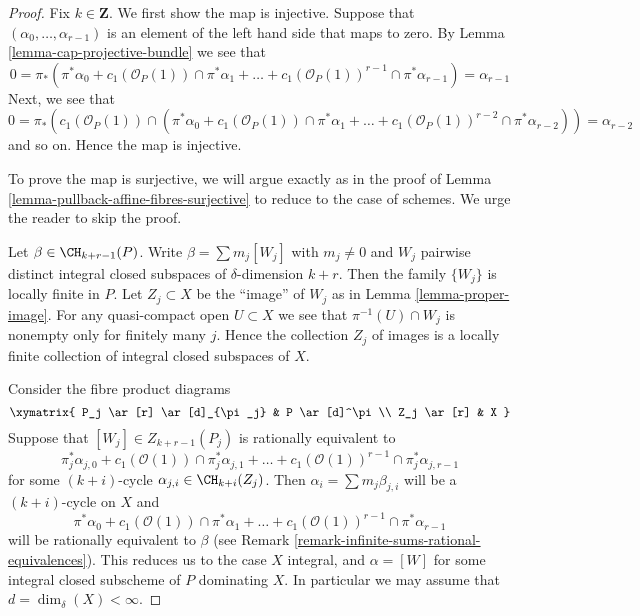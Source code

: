 \begin{proof}
Fix $k \in \mathbf{Z}$. We first show the map is injective.
Suppose that $(\alpha_0, \ldots, \alpha_{r - 1})$ is an element
of the left hand side that maps to zero.
By Lemma \ref{lemma-cap-projective-bundle} we see that
$$
0 = \pi_*(\pi^*\alpha_0 +
c_1(\mathcal{O}_P(1)) \cap \pi^*\alpha_1
+ \ldots +
c_1(\mathcal{O}_P(1))^{r - 1} \cap \pi^*\alpha_{r-1})
= \alpha_{r - 1}
$$
Next, we see that
$$
0 = \pi_*(c_1(\mathcal{O}_P(1)) \cap (\pi^*\alpha_0 +
c_1(\mathcal{O}_P(1)) \cap \pi^*\alpha_1
+ \ldots +
c_1(\mathcal{O}_P(1))^{r - 2} \cap \pi^*\alpha_{r - 2}))
= \alpha_{r - 2}
$$
and so on. Hence the map is injective.

\medskip\noindent
To prove the map is surjective, we will argue exactly
as in the proof of Lemma \ref{lemma-pullback-affine-fibres-surjective}
to reduce to the case of schemes.
We urge the reader to skip the proof.

\medskip\noindent
Let $\beta \in \CH_{k + r - 1}(P)$. Write $\beta = \sum m_j[W_j]$ with
$m_j \not = 0$ and $W_j$ pairwise distinct integral closed subspaces of
$\delta$-dimension $k + r$. Then the family $\{W_j\}$
is locally finite in $P$. Let $Z_j \subset X$ be the ``image''
of $W_j$ as in Lemma \ref{lemma-proper-image}. For any quasi-compact open
$U \subset X$ we see that $\pi^{-1}(U) \cap W_j$
is nonempty only for finitely many $j$. Hence the
collection $Z_j$ of images is a locally finite collection
of integral closed subspaces of $X$.

\medskip\noindent
Consider the fibre product diagrams
$$
\xymatrix{
P_j \ar[r] \ar[d]_{\pi_j} & P \ar[d]^\pi \\
Z_j \ar[r] & X
}
$$
Suppose that $[W_j] \in Z_{k + r - 1}(P_j)$
is rationally equivalent to
$$
\pi_j^*\alpha_{j, 0} +
c_1(\mathcal{O}(1)) \cap \pi_j^*\alpha_{j, 1} +
\ldots +
c_1(\mathcal{O}(1))^{r - 1} \cap \pi_j^*\alpha_{j, r - 1}
$$
for some $(k + i)$-cycle $\alpha_{j, i} \in \CH_{k + i}(Z_j)$. Then
$\alpha_i = \sum m_j \beta_{j, i}$ will be a $(k + i)$-cycle on $X$
and
$$
\pi^*\alpha_0 +
c_1(\mathcal{O}(1)) \cap \pi^*\alpha_1 +
\ldots +
c_1(\mathcal{O}(1))^{r - 1} \cap \pi^*\alpha_{r - 1}
$$
will be rationally equivalent to $\beta$ (see
Remark \ref{remark-infinite-sums-rational-equivalences}).
This reduces us to the case $X$ integral, and
$\alpha = [W]$ for some integral closed subscheme
of $P$ dominating $X$. In particular we may
assume that $d = \dim_\delta(X) < \infty$.


\end{proof}
